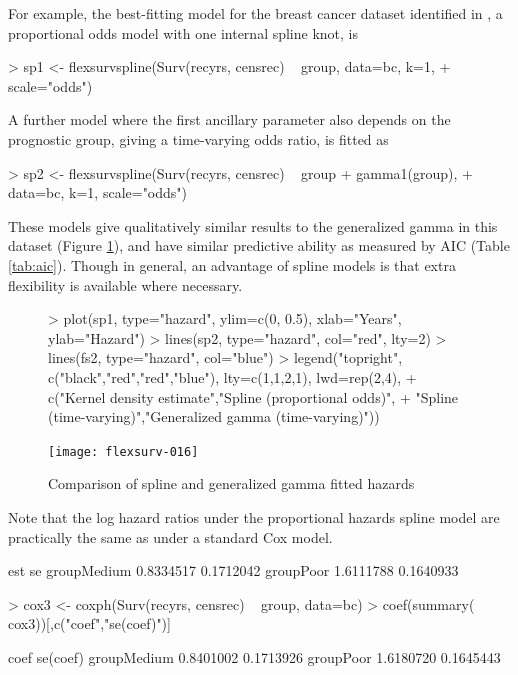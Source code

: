 \documentclass[nojss,nofooter]{jss}
\begin{document}
For example, the best-fitting model for the breast cancer dataset identified in \citet{royston:parmar},
a proportional odds model with one internal spline knot, is
\begin{Schunk}
\begin{Sinput}
> sp1 <- flexsurvspline(Surv(recyrs, censrec) ~ group, data=bc, k=1, 
+                       scale="odds")
\end{Sinput}
\end{Schunk}
A further model where the first ancillary parameter also depends on the prognostic
group, giving a time-varying odds ratio, is fitted as
\begin{Schunk}
\begin{Sinput}
> sp2 <- flexsurvspline(Surv(recyrs, censrec) ~ group + gamma1(group),
+                       data=bc, k=1, scale="odds")
\end{Sinput}
\end{Schunk}
These models give qualitatively similar results to the generalized
gamma in this dataset (Figure \ref{fig:spline:haz}), and have similar
predictive ability as measured by AIC (Table \ref{tab:aic}). Though in
general, an advantage of spline models is that extra flexibility is
available where necessary.
\begin{figure}[h]
  \centering
\begin{Schunk}
\begin{Sinput}
> plot(sp1, type="hazard", ylim=c(0, 0.5), xlab="Years", ylab="Hazard")
> lines(sp2, type="hazard", col="red", lty=2)
> lines(fs2, type="hazard", col="blue")
> legend("topright", c("black","red","red","blue"), lty=c(1,1,2,1), lwd=rep(2,4),
+        c("Kernel density estimate","Spline (proportional odds)",
+          "Spline (time-varying)","Generalized gamma (time-varying)"))
\end{Sinput}
\end{Schunk}
\texttt{[image: flexsurv-016]}
  \caption{Comparison of spline and generalized gamma fitted hazards}
  \label{fig:spline:haz}
\end{figure}
Note that the log hazard ratios under the proportional hazards spline
model are practically the same as under a standard Cox model.
\begin{Schunk}
\begin{Soutput}
                  est        se
groupMedium 0.8334517 0.1712042
groupPoor   1.6111788 0.1640933
\end{Soutput}
\begin{Sinput}
> cox3 <- coxph(Surv(recyrs, censrec) ~ group, data=bc)
> coef(summary(  cox3))[,c("coef","se(coef)")]
\end{Sinput}
\begin{Soutput}
                 coef  se(coef)
groupMedium 0.8401002 0.1713926
groupPoor   1.6180720 0.1645443
\end{Soutput}
\end{Schunk}
\end{document}
